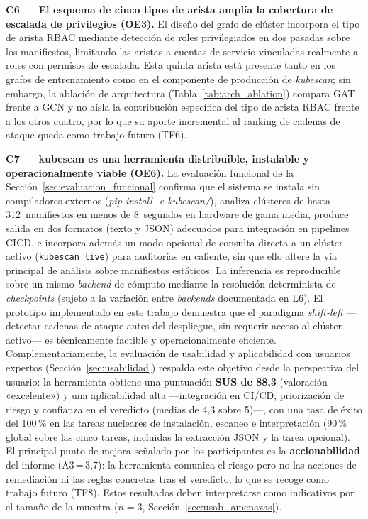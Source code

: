 \textbf{C6 — El esquema de cinco tipos de arista amplía la cobertura de escalada de
privilegios (OE3).} El diseño del grafo de clúster incorpora el tipo de arista
\ac{RBAC} mediante detección de roles privilegiados en dos pasadas sobre los
manifiestos, limitando las aristas a cuentas de servicio vinculadas realmente a
roles con permisos de escalada. Esta quinta arista está presente tanto en los
grafos de entrenamiento como en el componente de producción de \textit{kubescan};
sin embargo, la ablación de arquitectura (Tabla~\ref{tab:arch_ablation}) compara
\ac{GAT} frente a \ac{GCN} y no aísla la contribución específica del tipo de arista
\ac{RBAC} frente a los otros cuatro, por lo que su aporte incremental al ranking de
cadenas de ataque queda como trabajo futuro (TF6).

\textbf{C7 — kubescan es una herramienta distribuible, instalable y operacionalmente
viable (OE6).} La evaluación funcional de la Sección~\ref{sec:evaluacion_funcional}
confirma que el sistema se instala sin compiladores externos (\textit{pip install -e
kubescan/}), analiza clústeres de hasta 312~manifiestos en menos de 8~segundos en
hardware de gama media, produce salida en dos formatos (texto y \ac{JSON}) adecuados para
integración en pipelines \acs{CICD}, e incorpora además un modo opcional de consulta
directa a un clúster activo (\texttt{kubescan live}) para auditorías en caliente, sin
que ello altere la vía principal de análisis sobre manifiestos estáticos. La inferencia
es reproducible sobre un mismo \textit{backend} de cómputo mediante la resolución
determinista de \textit{checkpoints} (sujeto a la variación entre \textit{backends}
documentada en L6). El prototipo implementado
en este
trabajo demuestra que el paradigma \textit{shift-left} —detectar cadenas de ataque
antes del despliegue, sin requerir acceso al clúster activo— es técnicamente factible
y operacionalmente eficiente. Complementariamente, la evaluación de usabilidad y
aplicabilidad con usuarios expertos (Sección~\ref{sec:usabilidad}) respalda este
objetivo desde la perspectiva del usuario: la herramienta obtiene una puntuación
\textbf{SUS de 88,3} (valoración «excelente») y una aplicabilidad alta —integración
en CI/CD, priorización de riesgo y confianza en el veredicto (medias de 4,3 sobre
5)—, con una tasa de éxito del 100\,\% en las tareas nucleares de instalación,
escaneo e interpretación (90\,\% global sobre las cinco tareas, incluidas la
extracción \ac{JSON} y la tarea opcional). El principal punto de mejora señalado por
los participantes es la
\textbf{accionabilidad} del informe (A3\,=\,3,7): la herramienta comunica el
riesgo pero no las acciones de remediación ni las reglas concretas tras el
veredicto, lo que se recoge como trabajo futuro (TF8). Estos resultados deben
interpretarse como indicativos por el tamaño de la muestra (\(n=3\),
Sección~\ref{sec:usab_amenazas}).

